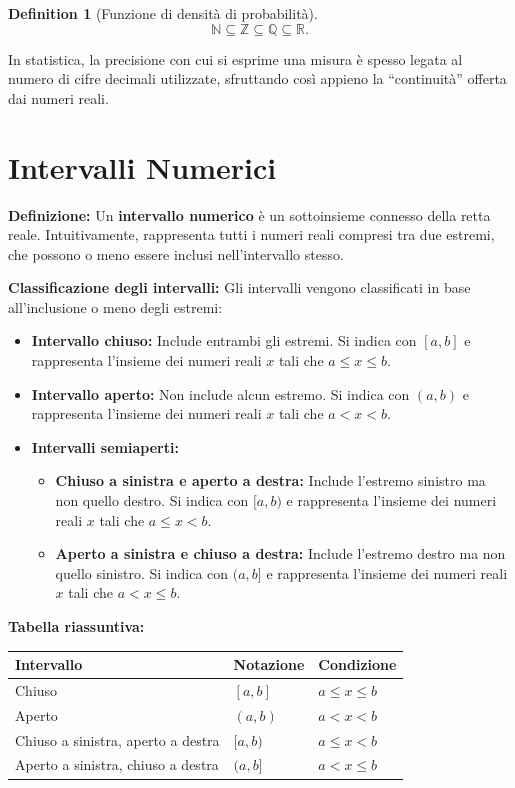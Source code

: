\documentclass[
  letterpaper,
  DIV=11,
  numbers=noendperiod,
  oneside]{scrreprt}
\providecommand{\tightlist}{%
  \setlength{\itemsep}{0pt}\setlength{\parskip}{0pt}}
\theoremstyle{definition}
\theoremstyle{plain}
\theoremstyle{definition}
\newtheorem{definition}{Definition}[chapter]
\theoremstyle{remark}
\begin{document}
\begin{definition}[Funzione di densità di
probabilità]
\[
\mathbb{N} \subseteq \mathbb{Z} \subseteq \mathbb{Q} \subseteq \mathbb{R}.
\]

In statistica, la precisione con cui si esprime una misura è spesso
legata al numero di cifre decimali utilizzate, sfruttando così appieno
la ``continuità'' offerta dai numeri reali.

\section{Intervalli Numerici}\label{intervalli-numerici}

\textbf{Definizione:} Un \textbf{intervallo numerico} è un sottoinsieme
connesso della retta reale. Intuitivamente, rappresenta tutti i numeri
reali compresi tra due estremi, che possono o meno essere inclusi
nell'intervallo stesso.

\textbf{Classificazione degli intervalli:} Gli intervalli vengono
classificati in base all'inclusione o meno degli estremi:

\begin{itemize}
\tightlist
\item
  \textbf{Intervallo chiuso:} Include entrambi gli estremi. Si indica
  con \([a, b]\) e rappresenta l'insieme dei numeri reali \(x\) tali che
  \(a \leq x \leq b\).
\item
  \textbf{Intervallo aperto:} Non include alcun estremo. Si indica con
  \((a, b)\) e rappresenta l'insieme dei numeri reali \(x\) tali che
  \(a < x < b\).
\item
  \textbf{Intervalli semiaperti:}

  \begin{itemize}
  \tightlist
  \item
    \textbf{Chiuso a sinistra e aperto a destra:} Include l'estremo
    sinistro ma non quello destro. Si indica con \([a, b)\) e
    rappresenta l'insieme dei numeri reali \(x\) tali che
    \(a \leq x < b\).
  \item
    \textbf{Aperto a sinistra e chiuso a destra:} Include l'estremo
    destro ma non quello sinistro. Si indica con \((a, b]\) e
    rappresenta l'insieme dei numeri reali \(x\) tali che
    \(a < x \leq b\).
  \end{itemize}
\end{itemize}

\textbf{Tabella riassuntiva:}

\begin{longtable}[]{@{}lll@{}}
\toprule\noalign{}
Intervallo & Notazione & Condizione \\
\midrule\noalign{}
\endhead
\bottomrule\noalign{}
\endlastfoot
Chiuso & \([a, b]\) & \(a \leq x \leq b\) \\
Aperto & \((a, b)\) & \(a < x < b\) \\
Chiuso a sinistra, aperto a destra & \([a, b)\) & \(a \leq x < b\) \\
Aperto a sinistra, chiuso a destra & \((a, b]\) & \(a < x \leq b\) \\
\end{longtable}


\end{definition}
\end{document}
